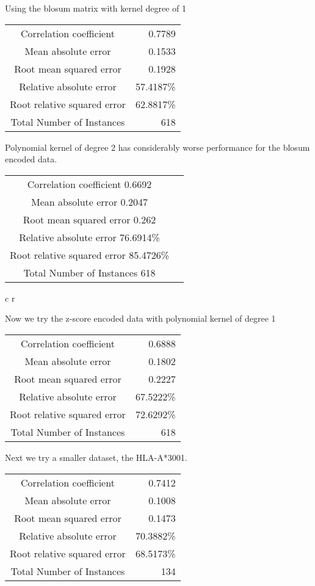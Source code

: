 Using the blosum matrix with kernel degree of 1
\begin{tabular}{ c r }
Correlation coefficient  &                0.7789 \\
Mean absolute error       &               0.1533 \\
Root mean squared error   &               0.1928 \\
Relative absolute error   &              57.4187\% \\
Root relative squared error  &           62.8817\% \\
Total Number of Instances     &         618  \\
\end{tabular}

Polynomial kernel of degree 2 has considerably worse performance for the blosum encoded data.
\begin{tabular}{ c r }	
Correlation coefficient                  0.6692 \\
Mean absolute error                      0.2047 \\
Root mean squared error                  0.262 \\
Relative absolute error                 76.6914\% \\
Root relative squared error             85.4726\% \\
Total Number of Instances              618  \\
\end{tabular}{ c r }

Now we try the z-score encoded data with polynomial kernel of degree 1
\begin{tabular}{ c r }
Correlation coefficient   &              0.6888 \\
Mean absolute error        &              0.1802 \\
Root mean squared error    &              0.2227 \\
Relative absolute error    &             67.5222\% \\
Root relative squared error &             72.6292\% \\
Total Number of Instances   &           618     \\
\end{tabular}

Next we try a smaller dataset, the HLA-A*3001.

\begin{tabular}{ c r }
Correlation coefficient       &           0.7412 \\
Mean absolute error            &          0.1008 \\
Root mean squared error        &          0.1473 \\
Relative absolute error        &         70.3882\% \\
Root relative squared error    &         68.5173\% \\
Total Number of Instances      &        134 \\
\end{tabular}

